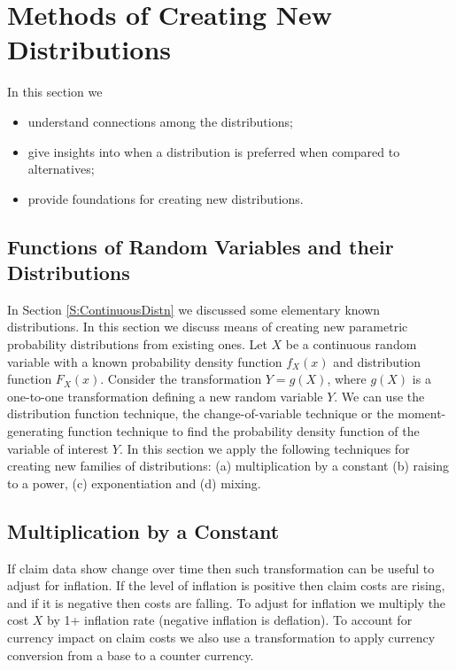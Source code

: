 \documentclass[]{book}
\providecommand{\tightlist}{%
  \setlength{\itemsep}{0pt}\setlength{\parskip}{0pt}}
\theoremstyle{definition}
\theoremstyle{definition}
\theoremstyle{definition}
\theoremstyle{remark}
\begin{document}
\section{Methods of Creating New Distributions}\label{MethodsCreation}

In this section we

\begin{itemize}
\tightlist
\item
  understand connections among the distributions;
\item
  give insights into when a distribution is preferred when compared to
  alternatives;
\item
  provide foundations for creating new distributions.
\end{itemize}

\subsection{Functions of Random Variables and their
Distributions}\label{functions-of-random-variables-and-their-distributions}

In Section \ref{S:ContinuousDistn} we discussed some elementary known
distributions. In this section we discuss means of creating new
parametric probability distributions from existing ones. Let \(X\) be a
continuous random variable with a known probability density function
\(f_{X}(x)\) and distribution function \(F_{X}(x)\). Consider the
transformation \(Y = g\left( X \right)\), where \(g(X)\) is a one-to-one
transformation defining a new random variable \(Y\). We can use the
distribution function technique, the change-of-variable technique or the
moment-generating function technique to find the probability density
function of the variable of interest \(Y\). In this section we apply the
following techniques for creating new families of distributions: (a)
multiplication by a constant (b) raising to a power, (c) exponentiation
and (d) mixing.

\subsection{Multiplication by a
Constant}\label{multiplication-by-a-constant}

If claim data show change over time then such transformation can be
useful to adjust for inflation. If the level of inflation is positive
then claim costs are rising, and if it is negative then costs are
falling. To adjust for inflation we multiply the cost \(X\) by 1+
inflation rate (negative inflation is deflation). To account for
currency impact on claim costs we also use a transformation to apply
currency conversion from a base to a counter currency.
\end{document}
